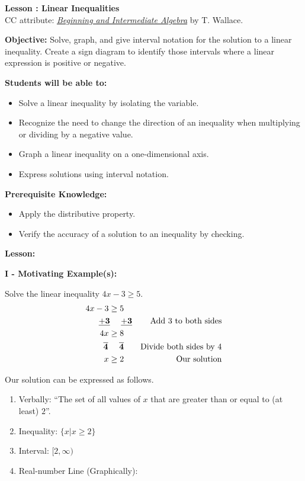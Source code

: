 \documentclass[12pt]{article}
\theoremstyle{definition}
\begin{document}
{\bf \large Lesson : Linear Inequalities}\label{les:linear_inequalities}\\
CC attribute: \href{http://www.wallace.ccfaculty.org/book/book.html}{\it{Beginning and Intermediate Algebra}} by T. Wallace. \hfill \doclicenseImage[imagewidth=5em]\\
\par
{\bf Objective:} Solve, graph, and give interval notation for the solution to a linear inequality.  Create a sign diagram to identify those intervals where a linear expression is positive or negative.\\
\par
{\bf Students will be able to:}
\begin{itemize}
	\item Solve a linear inequality by isolating the variable.
	\item Recognize the need to change the direction of an inequality when multiplying or dividing by a negative value.
	\item Graph a linear inequality on a one-dimensional axis.
	\item Express solutions using interval notation.
\end{itemize}
{\bf Prerequisite Knowledge:}
\begin{itemize}
	\item Apply the distributive property.
	\item Verify the accuracy of a solution to an inequality by checking.
\end{itemize}
\hrulefill

{\bf Lesson:}
\par
{\bf I - Motivating Example(s):}\\
\par
Solve the linear inequality  $4x-3\geq 5$. 
\begin{eqnarray*}
4x-3\geq 5~~~&&\\
{\bf\underline{+3}~~~~\underline{+3}} &&  \text{Add~} 3 \text{~to~both~sides} \\
4x\geq 8~~~ && \\
{\bf\overline{4}~~~~\overline{4}}~~~&& \text{Divide~both~sides~by~} 4\\
x\geq 2~~~ && \text{Our~solution}
\end{eqnarray*}

Our solution can be expressed as follows.

\begin{enumerate}
	\item Verbally: ``The set of all values of $x$ that are greater than or equal to (at least) $2$''.
	\item Inequality: $\{x|x\geq 2\}$
	\item Interval: $[2,\infty)$
	\item Real-number Line (Graphically): 
\end{enumerate}
\end{document}
